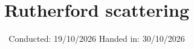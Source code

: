 


\subject{V16}
\title{Rutherford scattering}
\date{%
  Conducted: 19/10/2026
  \hspace{3em}
  Handed in: 30/10/2026
}



\maketitle
\thispagestyle{empty}
\tableofcontents
\newpage








\printbibliography{}





